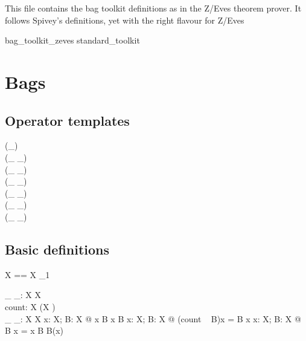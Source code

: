 \documentclass[draft,a4paper,10pt,wd]{article}
\begin{document}
This file contains the bag toolkit definitions as in the Z/Eves
theorem prover. It follows Spivey's definitions, yet with the
right flavour for Z/Eves

\begin{zsection}
\SECTION bag\_toolkit\_zeves \parents standard\_toolkit
\end{zsection}

\section{Bags }\label{def-bag}

\subsection*{Operator templates}

\begin{zed}
    \generic (\bag \_) \\
     \leftassoc (\_ \bcount \_) \\
     \leftassoc (\_ \otimes \_) \\
    \relation (\_ \inbag \_) \\
    \relation (\_ \subbageq \_) \\
     \leftassoc (\_ \uplus \_) \\
     \leftassoc (\_ \uminus \_)
\end{zed}

\subsection*{Basic definitions}

\begin{zed}
  \bag X == X \pfun \nat_1
\end{zed}

\begin{gendef}[X]
  \_ \inbag \_: X \rel \bag X \\
  count: \bag X \fun (X \fun \nat) \\
  \_ \bcount \_: \bag X \cross X \fun \nat
\where
  \forall x: X; B: \bag X @ x \inbag B \iff x \in \dom B
\also
  \forall x: X; B: \bag X @ (count ~ B)x = B \bcount x
\also
  \forall x: X; B: \bag X @ B \bcount x =
    \IF x \inbag B \THEN B(x) 
\end{gendef}
\end{document}
